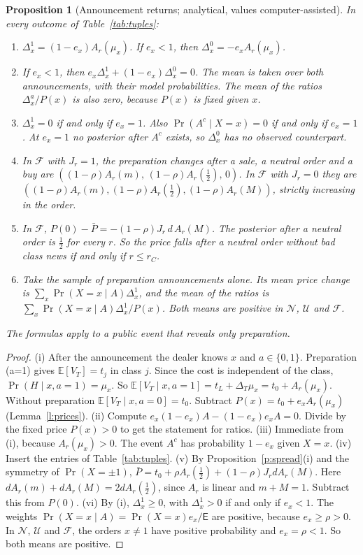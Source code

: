 \documentclass[12pt]{article}
\newtheorem{proposition}{Proposition}
\theoremstyle{definition}
\newcommand{\E}{\mathbb E}
\newcommand{\Ent}{\mathsf E}
\begin{document}
\begin{proposition}[Announcement returns; analytical, values computer-assisted]\label{p:event}
In every outcome of Table~\ref{tab:tuples}:
\begin{enumerate}[label=(\roman*)]
\item $\Delta^1_x=(1-e_x)A_r(\mu_x)$. If $e_x<1$, then $\Delta^0_x=-e_xA_r(\mu_x)$.
\item If $e_x<1$, then $e_x\Delta^1_x+(1-e_x)\Delta^0_x=0$. The mean is taken over both announcements, with their model probabilities. The mean of the ratios $\Delta^a_x/P(x)$ is also zero, because $P(x)$ is fixed given $x$.
\item $\Delta^1_x=0$ if and only if $e_x=1$. Also $\Pr(A^c\mid X=x)=0$ if and only if $e_x=1$. At $e_x=1$ no posterior after $A^c$ exists, so $\Delta^0_x$ has no observed counterpart.
\item In $\mathcal F$ with $J_r=1$, the preparation changes after a sale, a neutral order and a buy are $((1-\rho)A_r(m),\,(1-\rho)A_r(\tfrac12),\,0)$. In $\mathcal F$ with $J_r=0$ they are $((1-\rho)A_r(m),(1-\rho)A_r(\tfrac12),(1-\rho)A_r(M))$, strictly increasing in the order.
\item In $\mathcal F$, $P(0)-\bar P=-(1-\rho)J_r\,d\,A_r(M)$. The posterior after a neutral order is $\tfrac12$ for every $r$. So the price falls after a neutral order without bad class news if and only if $r\le r_C$.
\item Take the sample of preparation announcements alone. Its mean price change is $\sum_x\Pr(X=x\mid A)\Delta^1_x$, and the mean of the ratios is $\sum_x\Pr(X=x\mid A)\Delta^1_x/P(x)$. Both means are positive in $\mathcal N$, $\mathcal U$ and $\mathcal F$.
\end{enumerate}
The formulas apply to a public event that reveals only preparation.
\end{proposition}

\begin{proof}
(i) After the announcement the dealer knows $x$ and $a\in\{0,1\}$.
Preparation (a=1) gives $\E[V_T]=t_j$ in class $j$.
Since the cost is independent of the class, $\Pr(H\mid x,a=1)=\mu_x$.
So $\E[V_T\mid x,a=1]=t_L+\Delta_T\mu_x=t_0+A_r(\mu_x)$.
Without preparation $\E[V_T\mid x,a=0]=t_0$.
Subtract $P(x)=t_0+e_xA_r(\mu_x)$ (Lemma~\ref{l:prices}).
(ii) Compute $e_x(1-e_x)A-(1-e_x)e_xA=0$.
Divide by the fixed price $P(x)>0$ to get the statement for ratios.
(iii) Immediate from (i), because $A_r(\mu_x)>0$.
The event $A^c$ has probability $1-e_x$ given $X=x$.
(iv) Insert the entries of Table~\ref{tab:tuples}.
(v) By Proposition~\ref{p:spread}(i) and the symmetry of $\Pr(X=\pm1)$,
$\bar P=t_0+\rho A_r(\tfrac12)+(1-\rho)J_rdA_r(M)$.
Here $dA_r(m)+dA_r(M)=2dA_r(\tfrac12)$, since $A_r$ is linear and $m+M=1$.
Subtract this from $P(0)$.
(vi) By (i), $\Delta^1_x\ge0$, with $\Delta^1_x>0$ if and only if $e_x<1$.
The weights $\Pr(X=x\mid A)=\Pr(X=x)e_x/\Ent$ are positive, because $e_x\ge\rho>0$.
In $\mathcal N$, $\mathcal U$ and $\mathcal F$, the orders $x\ne1$ have positive probability and $e_x=\rho<1$.
So both means are positive.
\end{proof}
\end{document}
